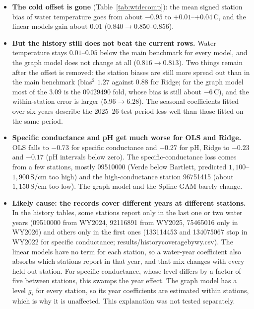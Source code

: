\documentclass[11pt]{article}
\newcommand{\codeus}{\textunderscore\allowbreak}
\newcommand{\code}[1]{{\ttfamily\let\_\codeus #1}}
\begin{document}
\begin{itemize}
  \item \textbf{The cold offset is gone} (Table~\ref{tab:wtdecomp}): the mean signed station bias
        of water temperature goes from about $-0.95$ to $+0.01$--$+0.04$\,\textdegree C, and the
        linear models gain about $0.01$ ($0.840\to0.850$--$0.856$).
  \item \textbf{But the history still does not beat the current rows.} Water temperature stays
        $0.01$--$0.05$ below the main benchmark for every model, and the graph model does not
        change at all ($0.816\to0.813$). Two things remain after the offset is removed: the station
        biases are still more spread out than in the main benchmark (bias$^2$ $1.27$ against
        $0.88$ for Ridge; for the graph model most of the $3.09$ is the 09429490 fold, whose bias is
        still about $-6$\,\textdegree C), and the within-station error is larger ($5.96\to6.28$).
        The seasonal coefficients fitted over six years describe the 2025--26 test period less
        well than those fitted on the same period.
  \item \textbf{Specific conductance and pH get much worse for OLS and Ridge.} OLS falls to $-0.73$
        for specific conductance and $-0.27$ for pH, Ridge to $-0.23$ and $-0.17$ (pH intervals
        below zero). The specific-conductance loss comes from a few stations, mostly 09510000 (Verde
        below Bartlett, predicted $1{,}100$--$1{,}900$\,\textmu S/cm too high) and the
        high-conductance station 96751415 (about $1{,}150$\,\textmu S/cm too low). The graph model and the Spline GAM barely change.
  \item \textbf{Likely cause: the records cover different years at different stations.} In the
        history tables, some stations report only in the last one or two water years (09510000 from
        WY2024, 92116891 from WY2025, 75465016 only in WY2026) and others only in the first ones
        (133114453 and 134075067 stop in WY2022 for specific conductance;
        \code{results/history\_coverage\_by\_wy.csv}). The linear models have no term for each
        station, so a water-year coefficient also absorbs which stations report in that year, and
        that mix changes with every held-out station. For specific conductance, whose level differs
        by a factor of five between stations, this swamps the year effect. The graph model has a
        level $g_i$ for every station, so its year coefficients are estimated within stations,
        which is why it is unaffected. This explanation was not tested separately.

\end{itemize}
\end{document}
